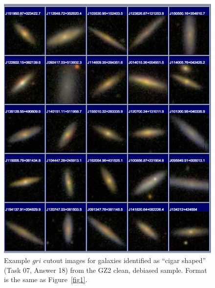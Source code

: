 \documentclass[useAMS,usenatbib]{mn2e}
\begin{document}
\newpage
\clearpage
\begin{figure}
\includegraphics[angle=0,width=7.0in]{figures/gallery/cigarshaped.png}
\caption{Example $gri$ cutout images for galaxies identified as ``cigar shaped'' (Task 07, Answer 18) from the GZ2 clean, debiased sample. Format is the same as Figure~\ref{fig1}.}
\end{figure}
\end{document}
